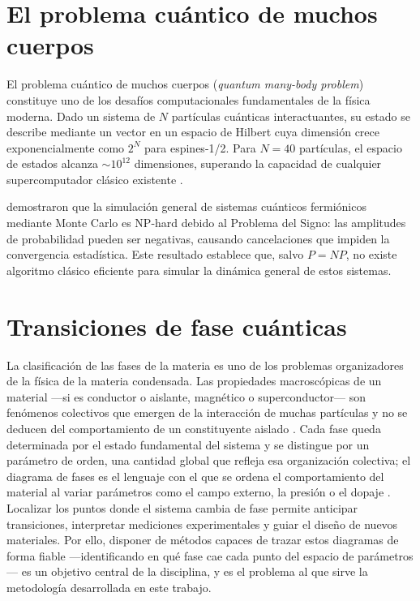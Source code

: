 \documentclass[11pt,a4paper,spanish]{book}
\begin{document}
\section{El problema cuántico de muchos cuerpos}

El problema cuántico de muchos cuerpos (\emph{quantum many-body problem}) constituye uno de los desafíos computacionales fundamentales de la física moderna. Dado un sistema de $N$ partículas cuánticas interactuantes, su estado se describe mediante un vector en un espacio de Hilbert cuya dimensión crece exponencialmente como $2^N$ para espines-1/2. Para $N = 40$ partículas, el espacio de estados alcanza $\sim 10^{12}$ dimensiones, superando la capacidad de cualquier supercomputador clásico existente \citep{feynman1982}.

\citet{troyer2005} demostraron que la simulación general de sistemas cuánticos fermiónicos mediante Monte Carlo es NP-hard debido al Problema del Signo: las amplitudes de probabilidad pueden ser negativas, causando cancelaciones que impiden la convergencia estadística. Este resultado establece que, salvo $P = NP$, no existe algoritmo clásico eficiente para simular la dinámica general de estos sistemas.

\section{Transiciones de fase cuánticas}

La clasificación de las fases de la materia es uno de los problemas organizadores de la física de la materia condensada. Las propiedades macroscópicas de un material ---si es conductor o aislante, magnético o superconductor--- son fenómenos colectivos que emergen de la interacción de muchas partículas y no se deducen del comportamiento de un constituyente aislado \citep{anderson1972}. Cada fase queda determinada por el estado fundamental del sistema y se distingue por un parámetro de orden, una cantidad global que refleja esa organización colectiva; el diagrama de fases es el lenguaje con el que se ordena el comportamiento del material al variar parámetros como el campo externo, la presión o el dopaje \citep{sachdev2011}. Localizar los puntos donde el sistema cambia de fase permite anticipar transiciones, interpretar mediciones experimentales y guiar el diseño de nuevos materiales. Por ello, disponer de métodos capaces de trazar estos diagramas de forma fiable ---identificando en qué fase cae cada punto del espacio de parámetros--- es un objetivo central de la disciplina, y es el problema al que sirve la metodología desarrollada en este trabajo.
\end{document}
